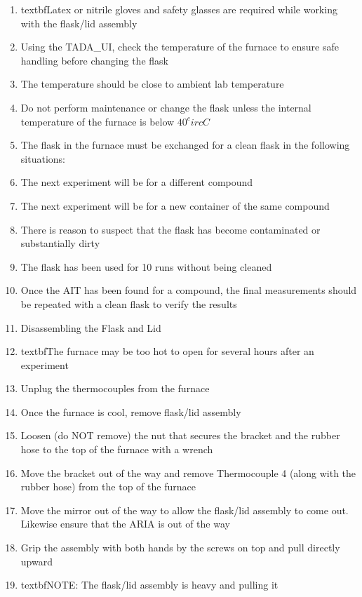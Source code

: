 \begin{enumerate}
\def\labelenumi{\arabic{enumi}.}
\item
  textbfLatex or nitrile gloves and safety glasses are required while
  working with the flask/lid assembly
\item
  Using the TADA\_UI, check the temperature of the furnace to ensure
  safe handling before changing the flask
\item
  The temperature should be close to ambient lab temperature
\item
  Do not perform maintenance or change the flask unless the internal
  temperature of the furnace is below \(40^circ C\)
\item
  The flask in the furnace must be exchanged for a clean flask in the
  following situations:
\item
  The next experiment will be for a different compound
\item
  The next experiment will be for a new container of the same compound
\item
  There is reason to suspect that the flask has become contaminated or
  substantially dirty
\item
  The flask has been used for 10 runs without being cleaned
\item
  Once the AIT has been found for a compound, the final measurements
  should be repeated with a clean flask to verify the results
\item
  Disassembling the Flask and Lid
\item
  textbfThe furnace may be too hot to open for several hours after an
  experiment
\item
  Unplug the thermocouples from the furnace
\item
  Once the furnace is cool, remove flask/lid assembly
\item
  Loosen (do NOT remove) the nut that secures the bracket and the rubber
  hose to the top of the furnace with a wrench
\item
  Move the bracket out of the way and remove Thermocouple 4 (along with
  the rubber hose) from the top of the furnace
\item
  Move the mirror out of the way to allow the flask/lid assembly to come
  out. Likewise ensure that the ARIA is out of the way
\item
  Grip the assembly with both hands by the screws on top and pull
  directly upward
\item
  textbfNOTE: The flask/lid assembly is heavy and pulling it\\

\end{enumerate}
